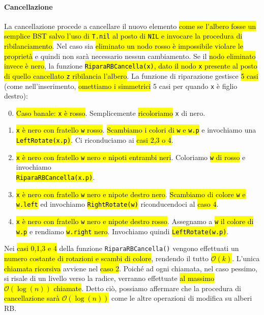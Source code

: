 \documentclass[a4paper,11pt,twoside]{article}
\theoremstyle{plain}
\theoremstyle{definition}
\theoremstyle{remark}
\begin{document}
\paragraph{Cancellazione} La cancellazione procede a cancellare il nuovo
elemento \hl{come se l'albero fosse un semplice BST salvo l'uso di
\texttt{T.nil} al posto di \texttt{NIL} e invocare la procedura di
ribilanciamento}. Nel caso sia \hl{eliminato un nodo rosso è impossibile violare
le proprietà} e quindi non sarà necessario nessun cambiamento. Se il \hl{nodo
eliminato invece è nero}, la funzione \hl{\texttt{RiparaRBCancella(x)}, dato il
nodo \texttt{x} presente al posto di quello cancellato \texttt{z} ribilancia
l'albero}. La funzione di riparazione gestisce \hl{5 casi} (come
nell'inserimento, \hl{omettiamo i simmetrici} 5 casi per quando \texttt{x} è
figlio destro):

\begin{enumerate}
  \setcounter{enumi}{-1}
  \item \hl{Caso banale: \texttt{x} è rosso}. Semplicemente \hl{ricoloriamo}
    \texttt{x} di nero.
  \item \hl{\texttt{x} è nero con fratello \texttt{w} rosso}. \hl{Scambiamo i
    colori di \texttt{w} e \texttt{w.p}} e invochiamo una
    \hl{\texttt{LeftRotate(x.p)}}. Ci riconduciamo ai \hl{casi 2,3 o 4}.
  \item \hl{\texttt{x} è nero con fratello \texttt{w} nero e nipoti entrambi
    neri}. Coloriamo \hl{\texttt{w} di rosso} e invochiamo \\
    \hl{\texttt{RiparaRBCancella(x.p)}}.
  \item \hl{\texttt{x} è nero con fratello \texttt{w} nero e nipote destro
    nero}. \hl{Scambiamo di colore \texttt{w} e \texttt{w.left}} ed invochiamo
    \hl{\texttt{RightRotate(w)}} riconducendoci al \hl{caso 4}.
  \item \hl{\texttt{x} è nero con fratello \texttt{w} nero e nipote destro
    rosso}. Assegnamo a \hl{\texttt{w} il colore di \texttt{w.p}} e rendiamo
    \hl{\texttt{w.right} nero}. Invochiamo quindi \hl{\texttt{LeftRotate(w.p)}}.
\end{enumerate}

\noindent Nei \hl{casi 0,1,3 e 4} della funzione \texttt{RiparaRBCancella()}
vengono effettuati un \hl{numero costante di rotazioni e scambi di colore},
rendendo il tutto \hl{$\mathcal{O}(k)$}. L'unica \hl{chiamata ricorsiva} avviene
nel \hl{caso 2}. Poiché ad ogni chiamata, nel caso pessimo, si risale di un
livello verso la radice, verranno effettuate \hl{al massimo
$\mathcal{O}(\log(n))$ chiamate}. Detto ciò, possiamo affermare che la procedura
di \hl{cancellazione sarà $\mathcal{O}(\log(n))$} come le altre operazioni di
modifica su alberi RB.
\end{document}

